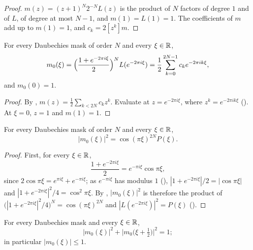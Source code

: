 \begin{proof}
\leanok
$m(z) = (z + 1)^N 2^{-N} L(z)$ is the product of $N$ factors of degree $1$ and of $L$, of degree
at most $N - 1$, and $m(1) = L(1) = 1$. The coefficients of $m$ add up to $m(1) = 1$, and
$c_k = 2 [z^k] m$.
\end{proof}

\begin{lemma}
\label{lem:daub-symbol-sum}
\leanok
{}
For every Daubechies mask of order $N$ and every $\xi \in \mathbb{R}$,
\[
  m_0(\xi) = \Bigl(\frac{1 + e^{-2\pi i \xi}}{2}\Bigr)^N L(e^{-2\pi i \xi})
  = \frac12 \sum_{k=0}^{2N-1} c_k e^{-2\pi i k \xi} ,
\]
and $m_0(0) = 1$.
\end{lemma}

\begin{proof}
\leanok
{}
By , $m(z) = \frac12 \sum_{k < 2N} c_k z^k$. Evaluate at
$z = e^{-2\pi i \xi}$, where $z^k = e^{-2\pi i k \xi}$ (). At $\xi = 0$,
$z = 1$ and $m(1) = 1$.
\end{proof}

\begin{proposition}
\label{prop:daub-symbol-modulus}
\leanok
{}
For every Daubechies mask of order $N$ and every $\xi \in \mathbb{R}$,
\[
  |m_0(\xi)|^2 = \cos(\pi\xi)^{2N} P(\xi) .
\]
\end{proposition}

\begin{proof}
\leanok
{}
First, for every $\xi \in \mathbb{R}$,
\[
  \frac{1 + e^{-2\pi i \xi}}{2} = e^{-\pi i \xi} \cos \pi\xi ,
\]
since $2 \cos \pi\xi = e^{\pi i \xi} + e^{-\pi i \xi}$; as $e^{-\pi i \xi}$ has modulus $1$
(), $|1 + e^{-2\pi i \xi}|/2 = |\cos \pi\xi|$ and
$|1 + e^{-2\pi i \xi}|^2/4 = \cos^2 \pi\xi$. By , $|m_0(\xi)|^2$ is
therefore the product of $\bigl(|1 + e^{-2\pi i \xi}|^2/4\bigr)^N = \cos(\pi\xi)^{2N}$ and
$|L(e^{-2\pi i \xi})|^2 = P(\xi)$ ().
\end{proof}

\begin{theorem}
\label{thm:daub-qmf}
\leanok
{}
For every Daubechies mask and every $\xi \in \mathbb{R}$,
\[
  |m_0(\xi)|^2 + \bigl|m_0\bigl(\xi + \tfrac12\bigr)\bigr|^2 = 1 ;
\]
in particular $|m_0(\xi)| \leq 1$.
\end{theorem}

